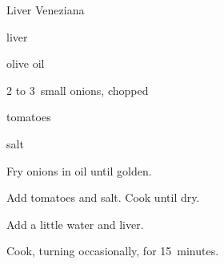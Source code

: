 \begin{recipe}{Liver Veneziana}{}{}

\begin{ingredients}
\item {} liver
\item olive oil
\item 2 to 3~small onions, chopped
\item tomatoes
\item salt
\end{ingredients}

\begin{directions}
\item Fry onions in oil until golden.
\item Add tomatoes and salt. Cook until dry.
\item Add a little water and liver.
\item Cook, turning occasionally, for 15~minutes.
\end{directions}

\end{recipe}
